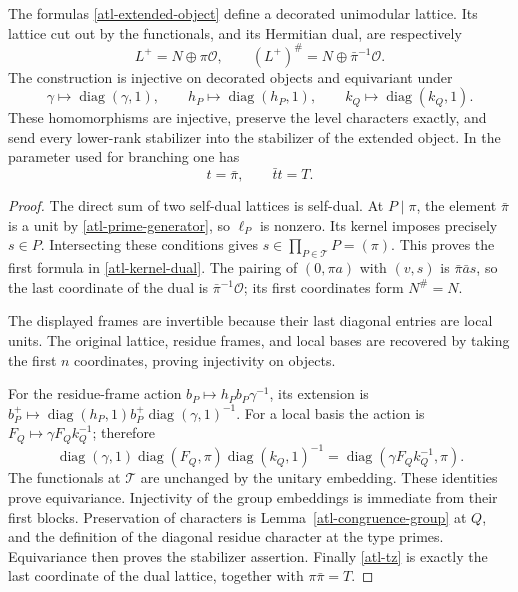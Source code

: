 \begin{proposition}\label{atl-extension}
The formulas \eqref{atl-extended-object} define a decorated
unimodular lattice.  Its lattice cut out by the functionals,
and its Hermitian dual, are respectively
\begin{equation}\label{atl-kernel-dual}
 L^+=N\oplus\pi\mathcal O,
               \qquad (L^+)^\#=N\oplus\bar\pi^{-1}\mathcal O.
\end{equation}
The construction is injective on decorated objects and
equivariant under
\[
 \gamma\longmapsto\operatorname{diag}(\gamma,1),\qquad
 h_P\longmapsto\operatorname{diag}(h_P,1),\qquad
 k_Q\longmapsto\operatorname{diag}(k_Q,1).
\]
These homomorphisms are injective, preserve the level
characters exactly, and send every lower-rank stabilizer
into the stabilizer of the extended object.  In the
parameter used for branching one has
\begin{equation}\label{atl-tz}
                            t=\bar\pi,\qquad \bar t t=T.
\end{equation}
\end{proposition}
\begin{proof}
The direct sum of two self-dual lattices is self-dual.
At $P\mid\pi$, the element $\bar\pi$ is a unit by
\eqref{atl-prime-generator}, so $\ell_P$ is nonzero.
Its kernel imposes precisely $s\in P$.  Intersecting
these conditions gives $s\in\prod_{P\in\mathcal T}P=(\pi)$.
This proves the first formula in \eqref{atl-kernel-dual}.
The pairing of $(0,\pi a)$ with $(v,s)$ is
$\bar\pi\bar a s$, so the last coordinate of the dual
is $\bar\pi^{-1}\mathcal O$; its first coordinates
form $N^\#=N$.

The displayed frames are invertible because their last
diagonal entries are local units.  The original lattice,
residue frames, and local bases are recovered by taking
the first $n$ coordinates, proving injectivity on objects.

For the residue-frame action
$b_P\mapsto h_Pb_P\gamma^{-1}$, its extension is
$b_P^+\mapsto\operatorname{diag}(h_P,1)b_P^+
\operatorname{diag}(\gamma,1)^{-1}$.
For a local basis the action is $F_Q\mapsto\gamma F_Qk_Q^{-1}$;
therefore
\[
 \operatorname{diag}(\gamma,1)\operatorname{diag}(F_Q,\pi)
       \operatorname{diag}(k_Q,1)^{-1}
                    =\operatorname{diag}(\gamma F_Qk_Q^{-1},\pi).
\]
The functionals at $\mathcal T$ are unchanged by the
unitary embedding.  These identities prove equivariance.
Injectivity of the group embeddings is immediate from
their first blocks.  Preservation of characters is
Lemma~\ref{atl-congruence-group} at $Q$, and the definition
of the diagonal residue character at the type primes.
Equivariance then proves the stabilizer assertion.
Finally \eqref{atl-tz} is exactly the last coordinate
of the dual lattice, together with $\pi\bar\pi=T$.
\end{proof}

